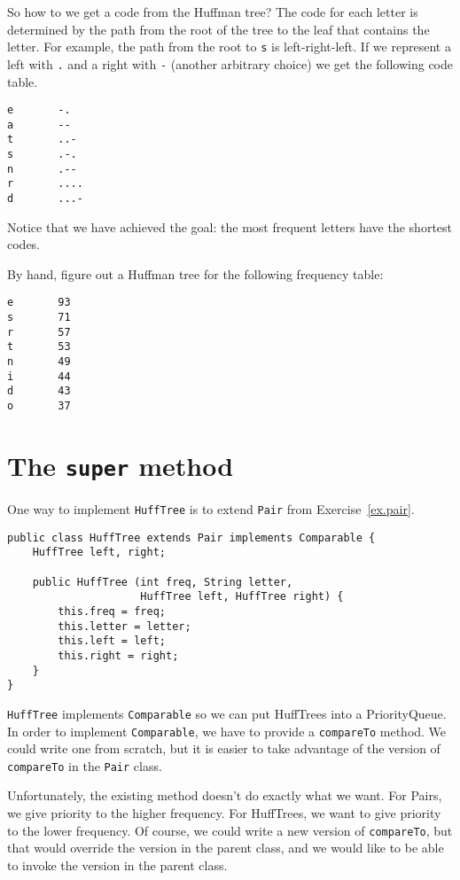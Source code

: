 So how to we get a code from the Huffman tree?  The code
for each letter is determined by the path from the root of the tree
to the leaf that contains the letter.  For example, the path
from the root to {\tt s} is left-right-left.  If we represent
a left with {\tt .} and a right with {\tt -} (another arbitrary
choice) we get the following code table.

\begin{verbatim}
e       -.
a       --
t       ..-
s       .-.
n       .--
r       ....
d       ...-
\end{verbatim}

Notice that we have achieved the goal: the most frequent letters
have the shortest codes.

\begin{exercise}
By hand, figure out a Huffman tree for the following frequency
table:

\begin{verbatim}
e       93
s       71
r       57
t       53
n       49
i       44
d       43
o       37
\end{verbatim}
\end{exercise}


\section{The {\tt super} method}

One way to implement {\tt HuffTree} is to extend {\tt Pair}
from Exercise~\ref{ex.pair}.

\begin{verbatim}
public class HuffTree extends Pair implements Comparable {
    HuffTree left, right;

    public HuffTree (int freq, String letter,
                     HuffTree left, HuffTree right) {
        this.freq = freq;
        this.letter = letter;
        this.left = left;
        this.right = right;
    }
}
\end{verbatim}

{\tt HuffTree} implements {\tt Comparable} so we can put HuffTrees
into a PriorityQueue.  In order to implement {\tt Comparable}, we have to
provide a {\tt compareTo} method.  We could write one from scratch,
but it is easier to take advantage of the version of {\tt compareTo}
in the {\tt Pair} class.

Unfortunately, the existing method doesn't do exactly what we want.
For Pairs, we give priority to the higher frequency.  For HuffTrees,
we want to give priority to the lower frequency.  Of course, we could
write a new version of {\tt compareTo}, but that would override the
version in the parent class, and we would like to be able to invoke
the version in the parent class.

